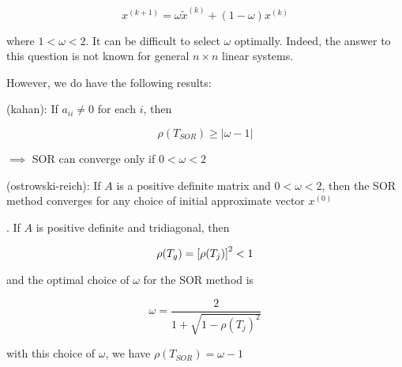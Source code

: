 \begin{equation*}
  x^{(k+1)} = \omega \tilde{x} ^{(k)} + (1-\omega) x^{(k)}
\end{equation*}

where $1<\omega<2$. It can be difficult to select $\omega$ optimally. Indeed, the answer
to this question is not known for general $n \times n$ linear systems.

However, we do have the following results:

\thm (kahan): If $a_{ii} \ne 0$ for each $i$, then

\begin{equation*}
  \rho(T_{SOR}) \geq |\omega-1|
\end{equation*}

$\implies$ SOR can converge only if $0< \omega < 2$

\thm (ostrowski-reich): If $A$ is a positive definite matrix and $0<\omega<2$, then 
the SOR method converges for any choice of initial approximate vector $x^{(0)}$

\thm. If $A$ is positive definite and tridiagonal, then 

\begin{equation*}
  \rho(T_g) = \bqty{
    \rho(T_j)
  }^2 < 1
\end{equation*}

and the optimal choice of $\omega$ for the SOR method is 

\begin{equation*}
  \omega = \frac{2}{1+\sqrt{1-\rho(T_j)^2}}
\end{equation*}

with this choice of $\omega$, we have $\rho(T_{SOR}) = \omega - 1$

